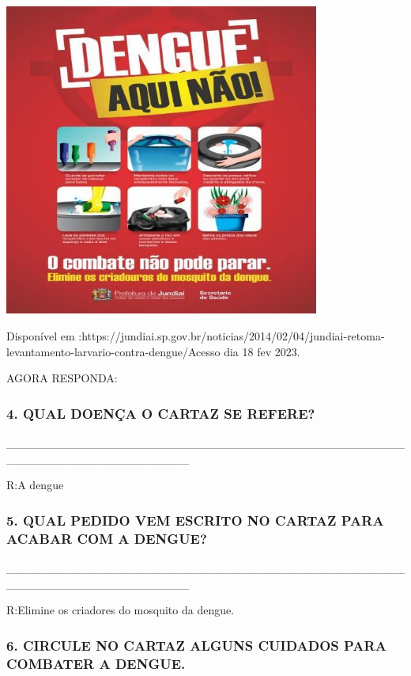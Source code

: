 \includegraphics[width=4.08681in,height=4.04722in]{media/image127.jpg}

Disponível em
:https://jundiai.sp.gov.br/noticias/2014/02/04/jundiai-retoma-levantamento-larvario-contra-dengue/Acesso
dia 18 fev 2023.

AGORA RESPONDA:

\subsubsection{4. QUAL DOENÇA O CARTAZ SE REFERE?
}\label{qual-doenuxe7a-o-cartaz-se-refere}

\_\_\_\_\_\_\_\_\_\_\_\_\_\_\_\_\_\_\_\_\_\_\_\_\_\_\_\_\_\_\_\_\_\_\_\_\_\_\_\_\_\_\_\_\_\_\_\_\_\_\_\_\_\_\_\_\_\_\_\_\_\_\_\_\_\_\_\_\_\_

R:A dengue

\subsubsection{5. QUAL PEDIDO VEM ESCRITO NO CARTAZ PARA ACABAR COM A
DENGUE?}\label{qual-pedido-vem-escrito-no-cartaz-para-acabar-com-a-dengue}

\_\_\_\_\_\_\_\_\_\_\_\_\_\_\_\_\_\_\_\_\_\_\_\_\_\_\_\_\_\_\_\_\_\_\_\_\_\_\_\_\_\_\_\_\_\_\_\_\_\_\_\_\_\_\_\_\_\_\_\_\_\_\_\_\_\_\_\_\_\_

R:Elimine os criadores do mosquito da dengue.

\subsubsection{6. CIRCULE NO CARTAZ ALGUNS CUIDADOS PARA COMBATER A
DENGUE.}\label{circule-no-cartaz-alguns-cuidados-para-combater-a-dengue.}

